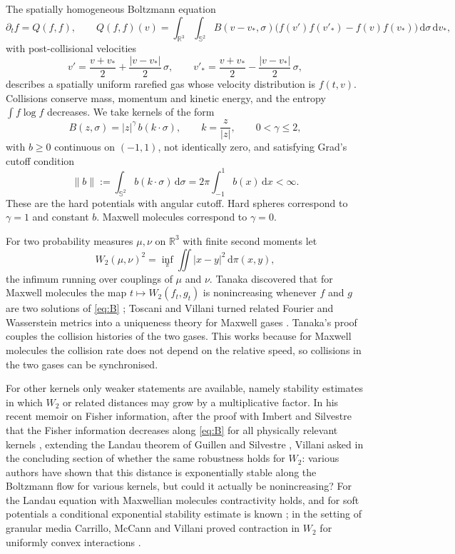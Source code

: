 \documentclass[11pt]{amsart}
\theoremstyle{definition}
\newcommand{\RR}{\mathbb{R}}
\newcommand{\Sph}{\mathbb{S}}
\newcommand{\dd}{\,\mathrm{d}}
\newcommand{\nb}{\|b\|}
\begin{document}
The spatially homogeneous Boltzmann equation
\begin{equation}\label{eq:B}
\partial_t f=Q(f,f),\qquad Q(f,f)(v)=\int_{\RR^3}\int_{\Sph^2}B(v-v_*,\sigma)\big(f(v')f(v'_*)-f(v)f(v_*)\big)\dd\sigma\dd v_*,
\end{equation}
with post-collisional velocities
\begin{equation}\label{eq:sigma}
v'=\frac{v+v_*}{2}+\frac{|v-v_*|}{2}\,\sigma,\qquad v'_*=\frac{v+v_*}{2}-\frac{|v-v_*|}{2}\,\sigma,
\end{equation}
describes a spatially uniform rarefied gas whose velocity distribution is $f(t,v)$. Collisions conserve mass, momentum and kinetic energy, and the entropy $\int f\log f$ decreases. We take kernels of the form
\begin{equation}\label{eq:kernel}
B(z,\sigma)=|z|^\gamma\, b(k\cdot\sigma),\qquad k=\frac{z}{|z|},\qquad 0<\gamma\le 2,
\end{equation}
with $b\ge0$ continuous on $(-1,1)$, not identically zero, and satisfying Grad's cutoff condition
\begin{equation}\label{eq:cutoff}
\nb:=\int_{\Sph^2}b(k\cdot\sigma)\dd\sigma=2\pi\int_{-1}^{1}b(x)\dd x<\infty .
\end{equation}
These are the hard potentials with angular cutoff. Hard spheres correspond to $\gamma=1$ and constant $b$. Maxwell molecules correspond to $\gamma=0$.

For two probability measures $\mu,\nu$ on $\RR^3$ with finite second moments let
\[
W_2(\mu,\nu)^2=\inf_{\pi}\iint|x-y|^2\dd\pi(x,y),
\]
the infimum running over couplings of $\mu$ and $\nu$. Tanaka discovered that for Maxwell molecules the map $t\mapsto W_2(f_t,g_t)$ is nonincreasing whenever $f$ and $g$ are two solutions of \eqref{eq:B} \cite{Tan73,Tan78}; Toscani and Villani turned related Fourier and Wasserstein metrics into a uniqueness theory for Maxwell gases \cite{TV99}. Tanaka's proof couples the collision histories of the two gases. This works because for Maxwell molecules the collision rate does not depend on the relative speed, so collisions in the two gases can be synchronised.

For other kernels only weaker statements are available, namely stability estimates in which $W_2$ or related distances may grow by a multiplicative factor. In his recent memoir on Fisher information, after the proof with Imbert and Silvestre that the Fisher information decreases along \eqref{eq:B} for all physically relevant kernels \cite{ISV25}, extending the Landau theorem of Guillen and Silvestre \cite{GS25}, Villani asked in the concluding section of \cite{Vil25} whether the same robustness holds for $W_2$: various authors have shown that this distance is exponentially stable along the Boltzmann flow for various kernels, but could it actually be nonincreasing? For the Landau equation with Maxwellian molecules contractivity holds, and for soft potentials a conditional exponential stability estimate is known \cite{CDGT25}; in the setting of granular media Carrillo, McCann and Villani proved contraction in $W_2$ for uniformly convex interactions \cite{CMV05}.
\end{document}
